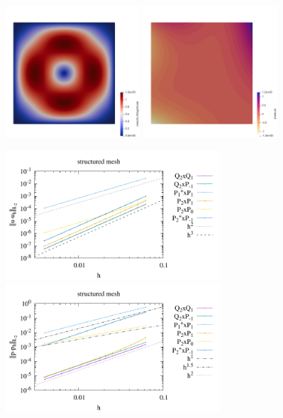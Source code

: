 \begin{center}
\includegraphics[width=5cm]{python_codes/fieldstone_120/images/jolm17_vel}
\includegraphics[width=5cm]{python_codes/fieldstone_120/images/jolm17_press}
\end{center}

\begin{center}
\includegraphics[width=8cm]{python_codes/fieldstone_120/paperresults/jolm17_structured_errorsV.pdf}
\includegraphics[width=8cm]{python_codes/fieldstone_120/paperresults/jolm17_structured_errorsP.pdf}
\end{center}

